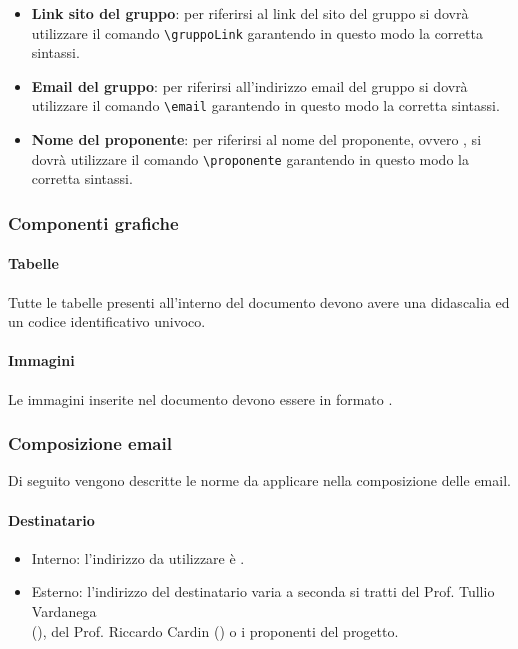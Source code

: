 \begin{itemize}
   \item \textbf{Link sito del gruppo}: per riferirsi al link del sito del gruppo si dovrà
   utilizzare il comando  \verb|\gruppoLink| garantendo in questo modo la corretta sintassi.
   \item \textbf{Email del gruppo}: per riferirsi all'indirizzo email del gruppo si dovrà
   utilizzare il comando  \verb|\email| garantendo in questo modo la corretta sintassi.
   \item \textbf{Nome del proponente}: per riferirsi al nome del proponente, ovvero \proponente, si dovrà
   utilizzare il comando   \verb|\proponente| garantendo in questo modo la corretta
   sintassi.
\end{itemize}

\subsubsection{Componenti grafiche}
\paragraph{Tabelle}
Tutte le tabelle presenti all'interno del documento devono avere una didascalia
ed un codice identificativo univoco.

\paragraph{Immagini}
Le immagini inserite nel documento devono essere in formato .

\subsubsection{Composizione email}
Di seguito vengono descritte le norme da applicare nella composizione delle email.

\paragraph{Destinatario}
\begin{itemize}
  \item Interno: l'indirizzo da utilizzare è \email.
  \item Esterno: l'indirizzo del destinatario varia a seconda si tratti del Prof. Tullio Vardanega \\ (), del Prof. Riccardo Cardin () o i proponenti del progetto.
\end{itemize}

